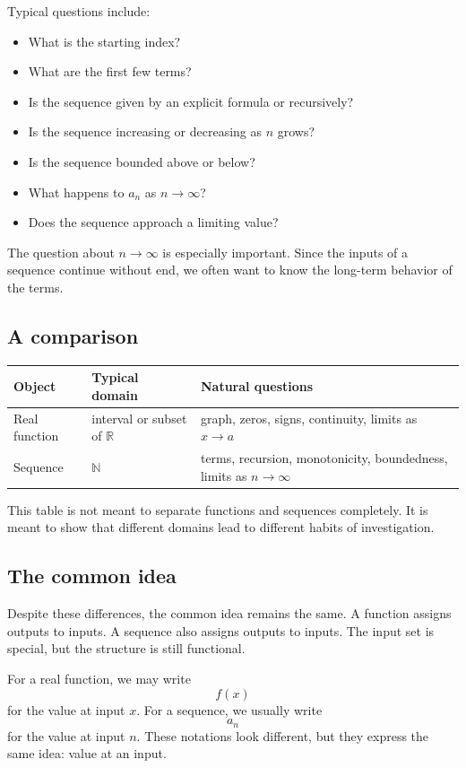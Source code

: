 Typical questions include:
\begin{itemize}
\item What is the starting index?
\item What are the first few terms?
\item Is the sequence given by an explicit formula or recursively?
\item Is the sequence increasing or decreasing as \(n\) grows?
\item Is the sequence bounded above or below?
\item What happens to \(a_n\) as \(n\to\infty\)?
\item Does the sequence approach a limiting value?
\end{itemize}

The question about \(n\to\infty\) is especially important. Since the inputs of a sequence continue without end, we often want to know the long-term behavior of the terms.

\subsection*{A comparison}

\begin{center}
\begin{tabular}{lll}
\toprule
Object & Typical domain & Natural questions \\
\midrule
Real function & interval or subset of \(\mathbb{R}\) & graph, zeros, signs, continuity, limits as \(x\to a\) \\
Sequence & \(\mathbb{N}\) & terms, recursion, monotonicity, boundedness, limits as \(n\to\infty\) \\
\bottomrule
\end{tabular}
\end{center}

This table is not meant to separate functions and sequences completely. It is meant to show that different domains lead to different habits of investigation.

\subsection*{The common idea}

Despite these differences, the common idea remains the same. A function assigns outputs to inputs. A sequence also assigns outputs to inputs. The input set is special, but the structure is still functional.

For a real function, we may write
\[
f(x)
\]
for the value at input \(x\). For a sequence, we usually write
\[
a_n
\]
for the value at input \(n\). These notations look different, but they express the same idea: value at an input.

